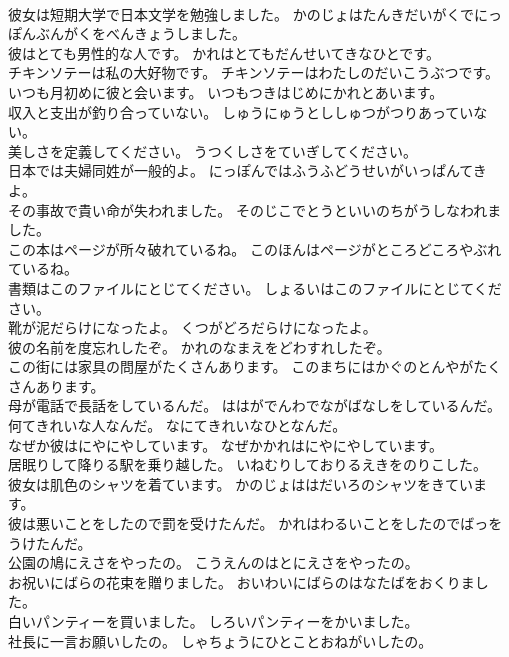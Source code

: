 \documentclass[8pt]{extreport}
\begin{document}
\begin{CJK}{UTF8}{min}
\\	彼女は短期大学で日本文学を勉強しました。	かのじょはたんきだいがくでにっぽんぶんがくをべんきょうしました。 
\\	彼はとても男性的な人です。	かれはとてもだんせいてきなひとです。 
\\	チキンソテーは私の大好物です。	チキンソテーはわたしのだいこうぶつです。 
\\	いつも月初めに彼と会います。	いつもつきはじめにかれとあいます。 
\\	収入と支出が釣り合っていない。	しゅうにゅうとししゅつがつりあっていない。 
\\	美しさを定義してください。	うつくしさをていぎしてください。 
\\	日本では夫婦同姓が一般的よ。	にっぽんではふうふどうせいがいっぱんてきよ。 
\\	その事故で貴い命が失われました。	そのじこでとうといいのちがうしなわれました。 
\\	この本はページが所々破れているね。	このほんはページがところどころやぶれているね。 
\\	書類はこのファイルにとじてください。	しょるいはこのファイルにとじてください。 
\\	靴が泥だらけになったよ。	くつがどろだらけになったよ。 
\\	彼の名前を度忘れしたぞ。	かれのなまえをどわすれしたぞ。 
\\	この街には家具の問屋がたくさんあります。	このまちにはかぐのとんやがたくさんあります。 
\\	母が電話で長話をしているんだ。	ははがでんわでながばなしをしているんだ。 
\\	何てきれいな人なんだ。	なにてきれいなひとなんだ。 
\\	なぜか彼はにやにやしています。	なぜかかれはにやにやしています。 
\\	居眠りして降りる駅を乗り越した。	いねむりしておりるえきをのりこした。 
\\	彼女は肌色のシャツを着ています。	かのじょははだいろのシャツをきています。 
\\	彼は悪いことをしたので罰を受けたんだ。	かれはわるいことをしたのでばっをうけたんだ。 
\\	公園の鳩にえさをやったの。	こうえんのはとにえさをやったの。 
\\	お祝いにばらの花束を贈りました。	おいわいにばらのはなたばをおくりました。 
\\	白いパンティーを買いました。	しろいパンティーをかいました。 
\\	社長に一言お願いしたの。	しゃちょうにひとことおねがいしたの。 

\end{CJK}
\end{document}
